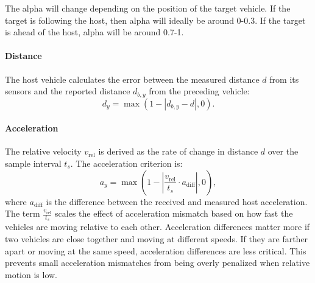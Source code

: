 \documentclass[letterpaper, 10pt, conference]{ieeeconf}  %
\begin{document}
The alpha will change depending on the position of the target vehicle. If the target is following the host, then alpha will ideally be around 0-0.3. If the target is ahead of the host, alpha will be around 0.7-1.

\paragraph{Distance} The host vehicle calculates the error between the measured distance $d$ from its sensors and the reported distance $d_{b,y}$ from the preceding vehicle:
\begin{equation}
    d_y = \max\left(1 - \left|d_{b,y} - d\right|, 0\right).
\end{equation}

\paragraph{Acceleration} The relative velocity $v_\text{rel}$ is derived as the rate of change in distance $d$ over the sample interval $t_s$. The acceleration criterion is:
\begin{equation}
    a_y = \max\left(1 - \left|\frac{v_\text{rel}}{t_s} \cdot a_\text{diff}\right|, 0\right),
\end{equation}
where $a_\text{diff}$ is the difference between the received and measured host acceleration. The term $\frac{v_\text{rel}}{t_s}$ scales the effect of acceleration mismatch based on how fast the vehicles are moving relative to each other.
Acceleration differences matter more if two vehicles are close together and moving at different speeds.
If they are farther apart or moving at the same speed, acceleration differences are less critical.
This prevents small acceleration mismatches from being overly penalized when relative motion is low.

\end{document}
